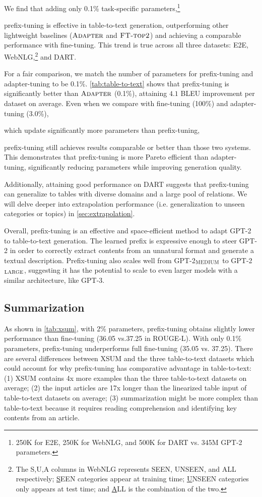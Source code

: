We find that adding only 0.1\% task-specific parameters,\footnote{250K for E2E, 250K for WebNLG, and 500K for DART vs. 345M GPT-2 parameters.}

prefix-tuning is effective in table-to-text generation, outperforming other lightweight baselines ($\textsc{Adapter}$ and $\textsc{FT-top2}$) and achieving a comparable performance with fine-tuning. This trend is true across all three datasets: E2E, WebNLG,\footnote{The S,U,A columns in WebNLG represents SEEN, UNSEEN, and ALL respectively; \underline{S}EEN categories appear at training time; \underline{U}NSEEN categories only appears at test time; and \underline{A}LL is the combination of the two.} and DART.

For a fair comparison, we match the number of parameters for prefix-tuning and adapter-tuning to be 0.1\%. \ref{tab:table-to-text} shows that prefix-tuning is significantly better than $\textsc{Adapter}$ (0.1\%), attaining $4.1$ BLEU improvement per dataset on average. Even when we compare with fine-tuning (100\%) and adapter-tuning (3.0\%),

which update significantly more parameters than prefix-tuning,

prefix-tuning still achieves results comparable or better than those two systems. This demonstrates that prefix-tuning is more Pareto efficient than adapter-tuning, significantly reducing parameters while improving generation quality. 

Additionally, attaining good performance on DART suggests that prefix-tuning can generalize to tables with diverse domains and a large pool of relations. We will delve deeper into extrapolation performance (i.e. generalization to unseen categories or topics) in \ref{sec:extrapolation}. 

Overall, prefix-tuning is an effective and space-efficient method to adapt GPT-2 to table-to-text generation. The learned prefix is expressive enough to steer GPT-2 in order to correctly extract contents from an unnatural format and generate a textual description. Prefix-tuning also scales well from GPT-2$_{\textsc{MEDIUM}}$ to GPT-2$_{\textsc{LARGE}}$, suggesting it has the potential to scale to even larger models with a similar architecture, like GPT-3. 

\subsection{Summarization}
\label{ssec:summarization}

As shown in \ref{tab:xsum}, with 2\% parameters, prefix-tuning obtains slightly lower performance than fine-tuning (36.05 vs.\@ 37.25 in ROUGE-L). With only 0.1\% parameters, prefix-tuning underperforms full fine-tuning (35.05 vs. 37.25). There are several differences between XSUM and the three table-to-text datasets which could account for why prefix-tuning has comparative advantage in table-to-text: (1) XSUM contains 4x more examples than the three table-to-text datasets on average; (2) the input articles are 17x longer than the linearized table input of table-to-text datasets on average; (3) summarization might be more complex than table-to-text because it requires reading comprehension and identifying key contents from an article. 

